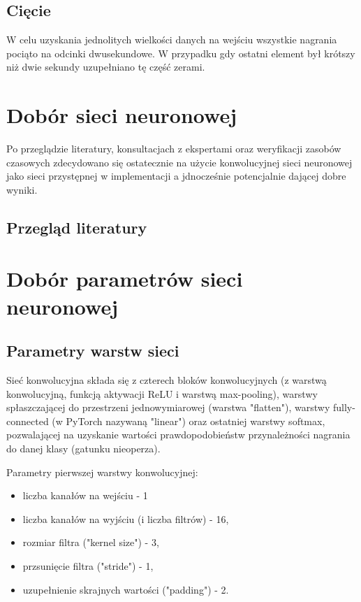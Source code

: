 \documentclass{sprz}
\begin{document}
\subsection{Cięcie}
W celu uzyskania jednolitych wielkości danych na wejściu wszystkie nagrania pociąto na odcinki dwusekundowe. W przypadku gdy ostatni element był krótszy niż dwie sekundy uzupełniano tę część zerami.

\section{Dobór sieci neuronowej}
Po przeglądzie literatury, konsultacjach z ekspertami oraz weryfikacji zasobów czasowych zdecydowano się ostatecznie na użycie konwolucyjnej sieci neuronowej jako sieci przystępnej w implementacji a jdnocześnie potencjalnie dającej dobre wyniki.

\subsection{Przegląd literatury}


\section{Dobór parametrów sieci neuronowej}

\subsection{Parametry warstw sieci}
Sieć konwolucyjna składa się z czterech bloków konwolucyjnych (z warstwą konwolucyjną, funkcją aktywacji ReLU i warstwą max-pooling), warstwy spłaszczającej do przestrzeni jednowymiarowej (warstwa "flatten"), warstwy fully-connected (w PyTorch nazywaną "linear") oraz ostatniej warstwy softmax, pozwalającej na uzyskanie wartości prawdopodobieństw przynależności nagrania do danej klasy (gatunku nieoperza).

Parametry pierwszej warstwy konwolucyjnej:
\begin{itemize}
  \item{liczba kanałów na wejściu - 1}
  \item{liczba kanałów na wyjściu (i liczba filtrów) - 16,}
  \item{rozmiar filtra ("kernel size") - 3,}
  \item {przsunięcie filtra ("stride") - 1,}
  \item{uzupełnienie skrajnych wartości ("padding") - 2.}
\end{itemize}
\end{document}

